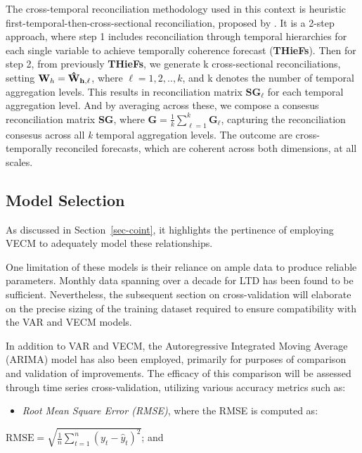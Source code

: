 \documentclass[
  11pt,
  a4paper,
]{article}
\providecommand{\tightlist}{%
  \setlength{\itemsep}{0pt}\setlength{\parskip}{0pt}}\usepackage{longtable,booktabs,array}
\begin{document}
The cross-temporal reconciliation methodology used in this context is
heuristic first-temporal-then-cross-sectional reconciliation, proposed
by \textcite{kourentzes2019cross}. It is a 2-step approach, where step 1
includes reconciliation through temporal hierarchies for each single
variable to achieve temporally coherence forecast (\textbf{THieFs}).
Then for step 2, from previously \textbf{THieFs}, we generate k
cross-sectional reconciliations, setting
\(\textbf{W}_{h} = \bf{\hat{W}}_{h,\ell}\), where \(\ell = 1,2,..,k\),
and k denotes the number of temporal aggregation levels. This results in
reconciliation matrix \(\textbf{SG}_{\ell}\) for each temporal
aggregation level. And by averaging across these, we compose a consesus
reconciliation matrix \textbf{SG}, where
\(\textbf{G} = \frac{1}{k}\sum_{\ell=1}^{k}\textbf{G}_{\ell}\),
capturing the reconciliation consesus across all \emph{k} temporal
aggregation levels. The outcome are cross-temporally reconciled
forecasts, which are coherent across both dimensions, at all scales.

\subsection{Model Selection}\label{model-selection}

As discussed in Section~\ref{sec-coint}, it highlights the pertinence of
employing VECM to adequately model these relationships.

One limitation of these models is their reliance on ample data to
produce reliable parameters. Monthly data spanning over a decade for LTD
has been found to be sufficient. Nevertheless, the subsequent section on
cross-validation will elaborate on the precise sizing of the training
dataset required to ensure compatibility with the VAR and VECM models.

In addition to VAR and VECM, the Autoregressive Integrated Moving
Average (ARIMA) model has also been employed, primarily for purposes of
comparison and validation of improvements. The efficacy of this
comparison will be assessed through time series cross-validation,
utilizing various accuracy metrics such as:

\begin{itemize}
\tightlist
\item
  \emph{Root Mean Square Error (RMSE)}, where the RMSE is computed as:
\end{itemize}

\(\text{RMSE} = \sqrt{\frac{1}{n} \sum_{t=1}^{n} (y_t - \hat{y}_t)^2}\);
and
\end{document}
